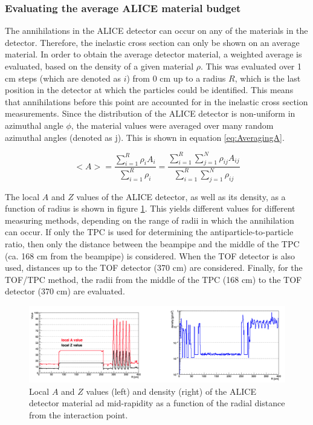 \subsubsection{Evaluating the average ALICE material budget}\label{sec:Meth:AveragingMaterial}
The annihilations in the ALICE detector can occur on any of the materials in the detector. Therefore, the inelastic cross section can only be shown on an average material. In order to obtain the average detector material, a weighted average is evaluated, based on the density of a given material $\rho$. This was evaluated over 1 cm steps (which are denoted as $i$) from 0 cm up to a radius $R$, which is the last position in the detector at which the particles could be identified. This means that annihilations before this point are accounted for in the inelastic cross section measurements. Since the distribution of the ALICE detector is non-uniform in azimuthal angle $\phi$, the material values were averaged over many random azimuthal angles (denoted as j). This is shown in equation \ref{eq:AveragingA}. 


\begin{equation}\label{eq:AveragingA}
<A> = 
\frac{\sum_{i=1}^R \rho_iA_i}{\sum_{i=1}^R \rho_i} = 
\frac{\sum_{i=1}^R \sum_{j=1}^N \rho_{ij}A_{ij}}{\sum_{i=1}^R \sum_{j=1}^N \rho_{ij}}
\end{equation}


The local $A$ and $Z$ values of the ALICE detector, as well as its density, as a function of radius is shown in figure \ref{fig:localMaterialValuesALICE}. This yields different values for different measuring methods, depending on the range of radii in which the annihilation can occur. If only the TPC is used for determining the antiparticle-to-particle ratio, then only the distance between the beampipe and the middle of the TPC (ca. 168 cm from the beampipe) is considered. When the TOF detector is also used, distances up to the TOF detector (370 cm) are considered. Finally, for the TOF/TPC method, the radii from the middle of the TPC (168 cm) to the TOF detector (370 cm) are evaluated. \\

\begin{figure}
    \centering
    \includegraphics[width=\textwidth]{figures/averageA.png}
    \caption{Local $A$ and $Z$ values (left) and density (right) of the ALICE detector material ad mid-rapidity as a function of the radial distance from the interaction point.}
    \label{fig:localMaterialValuesALICE}
\end{figure}

